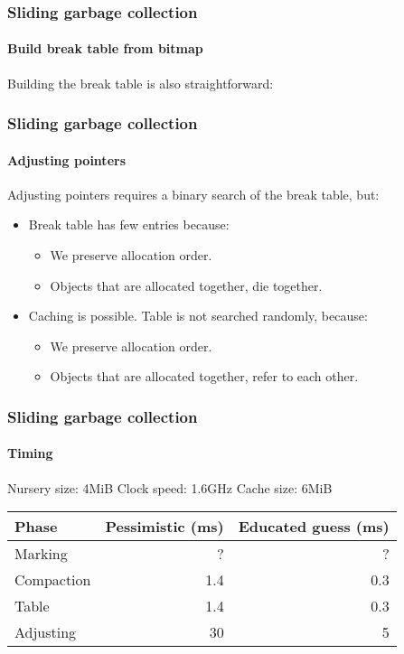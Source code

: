 \documentclass[12pt]{beamer}
\def\inputfig#1{}
\begin{document}
\begin{frame}
  \frametitle{Sliding garbage collection} 
  \framesubtitle{Build break table from bitmap}

  Building the break table is also straightforward:

  \begin{center}
\inputfig{fig-example-d.pdf_t}
  \end{center}

\end{frame}
\begin{frame}
  \frametitle{Sliding garbage collection} 
  \framesubtitle{Adjusting pointers}

  Adjusting pointers requires a binary search of the break table, but: 

  \begin{itemize}
  \item Break table has few entries because:
    \begin{itemize}
    \item We preserve allocation order.
    \item Objects that are allocated together, die together.
    \end{itemize}
  \item Caching is possible.  Table is not searched randomly, because: 
    \begin{itemize}
    \item We preserve allocation order.
    \item Objects that are allocated together, refer to each other.
    \end{itemize}
  \end{itemize}

\end{frame}
\begin{frame}
  \frametitle{Sliding garbage collection}
  \framesubtitle{Timing}

Nursery size: 4MiB
\vskip 0.25cm
Clock speed: 1.6GHz
\vskip 0.25cm
Cache size: 6MiB
\vskip 0.5cm
\begin{tabular}{|l|r|r|}
  \hline
  Phase & Pessimistic (ms) & Educated guess (ms)\\
  \hline
  \hline
  Marking & ? & ?\\
  \hline
  Compaction & 1.4 &  0.3\\
  \hline
  Table   & 1.4 & 0.3 \\
  \hline
  Adjusting & 30 & 5 \\
  \hline
\end{tabular}

\end{frame}
\end{document}
